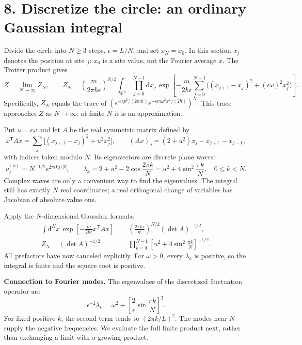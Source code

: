\documentclass[11pt,letterpaper]{article}
\newcommand{\dd}{\mathrm{d}}
\begin{document}
\section*{8. Discretize the circle: an ordinary Gaussian integral}
Divide the circle into $N\geq3$ steps, $\epsilon=L/N$, and set $x_N=x_0$.
In this section $x_j$ denotes the position at site $j$; $x_0$ is a site value,
not the Fourier average $\bar x$. The Trotter product gives
\begin{equation}
 Z=\lim_{N\to\infty}Z_N,\qquad
 Z_N=\left(\frac{m}{2\pi\hbar\epsilon}\right)^{N/2}
 \int_{\mathbb R^N}\prod_{j=0}^{N-1}\dd x_j\,
 \exp\!\left[-\frac{m}{2\hbar\epsilon}
 \sum_{j=0}^{N-1}\bigl((x_{j+1}-x_j)^2+
 (\epsilon\omega)^2x_j^2\bigr)\right].
 \label{eq:lattice}
\end{equation}
Specifically, $Z_N$ equals the trace of
$(e^{-\epsilon p^2/(2m\hbar)}e^{-\epsilon m\omega^2x^2/(2\hbar)})^N$.
This trace approaches $Z$ as $N\to\infty$; at finite $N$ it is an approximation.

Put $u=\epsilon\omega$ and let $A$ be the real symmetric matrix defined by
\[
 x^{\mathsf T}Ax=\sum_j\bigl[(x_{j+1}-x_j)^2+u^2x_j^2\bigr],
 \qquad (Ax)_j=(2+u^2)x_j-x_{j+1}-x_{j-1},
\]
with indices taken modulo $N$. Its eigenvectors are discrete plane waves:
\[
 v_j^{(k)}=N^{-1/2}e^{2\pi i kj/N},\qquad
 \lambda_k=2+u^2-2\cos\frac{2\pi k}{N}
 =u^2+4\sin^2\frac{\pi k}{N},\quad 0\leq k<N.
\]
Complex waves are only a convenient way to find the eigenvalues.
The integral still has exactly $N$ real coordinates; a real orthogonal
change of variables has Jacobian of absolute value one.

Apply the $N$-dimensional Gaussian formula:
\begin{align}
 \int\dd^Nx\,\exp\!\left[-\frac{m}{2\hbar\epsilon}
 x^{\mathsf T}Ax\right]
 &=\left(\frac{2\pi\hbar\epsilon}{m}\right)^{N/2}
 (\det A)^{-1/2},\\
 \boxed{Z_N=(\det A)^{-1/2}}
 &=\prod_{k=0}^{N-1}
 \left[u^2+4\sin^2\frac{\pi k}{N}\right]^{-1/2}.
 \label{eq:det}
\end{align}
All prefactors have now canceled explicitly. For $\omega>0$, every
$\lambda_k$ is positive, so the integral is finite and the square root is positive.

\textbf{Connection to Fourier modes.} The eigenvalues of the discretized
fluctuation operator are
\[
 \epsilon^{-2}\lambda_k=\omega^2+
 \left[\frac{2}{\epsilon}\sin\frac{\pi k}{N}\right]^2.
\]
For fixed positive $k$, the second term tends to $(2\pi k/L)^2$.
The modes near $N$ supply the negative frequencies. We evaluate the full
finite product next, rather than exchanging a limit with a growing product.
\end{document}
